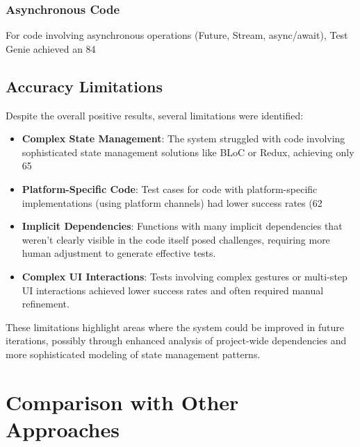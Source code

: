 \subsubsection{Asynchronous Code}

For code involving asynchronous operations (Future, Stream, async/await), Test Genie achieved an 84%

\subsection{Accuracy Limitations}

Despite the overall positive results, several limitations were identified:

\begin{itemize}
    \item \textbf{Complex State Management}: The system struggled with code involving sophisticated state management solutions like BLoC or Redux, achieving only 65%
    
    \item \textbf{Platform-Specific Code}: Test cases for code with platform-specific implementations (using platform channels) had lower success rates (62%
    
    \item \textbf{Implicit Dependencies}: Functions with many implicit dependencies that weren't clearly visible in the code itself posed challenges, requiring more human adjustment to generate effective tests.
    
    \item \textbf{Complex UI Interactions}: Tests involving complex gestures or multi-step UI interactions achieved lower success rates and often required manual refinement.
\end{itemize}

These limitations highlight areas where the system could be improved in future iterations, possibly through enhanced analysis of project-wide dependencies and more sophisticated modeling of state management patterns.

\section{Comparison with Other Approaches}

